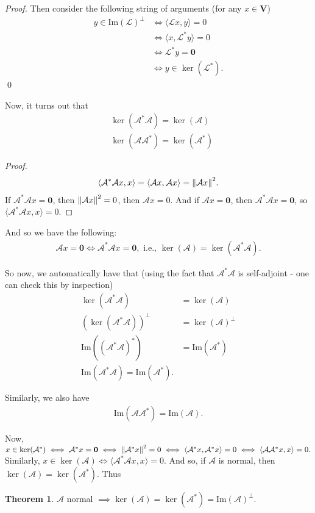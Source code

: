 \documentclass{article}
\theoremstyle{definition}
\newtheorem{thm}{Theorem}[section]
\newcommand{\V}{\mathbf{V}}
\newcommand{\A}{\mathcal{A}}
\newcommand{\lag}{\mathcal{L}}
\newcommand{\ima}{\text{Im}}
\newcommand{\la}{\langle}
\newcommand{\ra}{\rangle}
\begin{document}
\begin{proof}
	Then consider the following string of arguments (for any $x\in \V$)
	\begin{align*}
	y \in \ima(\lag)^\perp &\iff \la \lag x,y \ra = 0\\
	&\iff \la x, \lag^*y \ra = 0\\
	&\iff \lag^* y = \mathbf{0}\\
	&\iff y\in \ker(\lag^*).
	\end{align*}\qed
\end{proof}



Now, it turns out that 
\begin{align*}
&\ker(\A^*\A) = \ker(\A)\\
&\ker(\A\A^*) = \ker(\A^*)
\end{align*}

\begin{proof}
	\begin{align*}
	\la \A^*\A x,x \ra = \la \A x,\A x \ra = \norm{\A x}^2.
	\end{align*}
	If $\A^*\A x = \mathbf{0}$, then $\norm{\A x}^2 = 0$, then $\A x = 0$. And if $\A x = \mathbf{0}$, then $\A^*\A x = \mathbf{0}$, so $\la \A^*\A x,x\ra = 0$. 
\end{proof}

And so we have the following:
\begin{align*}
\A x = \mathbf{0} \iff \A^*\A x = \mathbf{0}, \text{ i.e., } \ker(\A) = \ker(\A^*\A).
\end{align*}

So now, we automatically have that (using the fact that $\A^*\A$ is self-adjoint - one can check this by inspection)
\begin{align*}
\ker(\A^*\A) &= \ker(\A)\\
(\ker(\A^*\A))^\perp &= \ker(\A)^\perp\\
\ima({(\A^*\A)}^*) &= \ima(\A^*)\\
\ima(\A^*\A) = \ima(\A^*).
\end{align*}

Similarly, we also have 
\begin{align*}
\ima(\A\A^*) = \ima(\A).
\end{align*}


Now, $x\in \ker(\A^*) \iff \A^* x = \mathbf{0} \iff \norm{\A^* x}^2 = 0\iff
\la \A^* x, \A^* x \ra = 0\iff \la \A\A^* x, x \ra = 0.$
Similarly, $x\in \ker(\A) \iff \la \A^*\A x,x \ra = 0$. And so, if $\A$ is normal, then $\ker(\A) = \ker(\A^*)$. Thus
\begin{thm}
	$\A$ normal $\implies \ker(\A) = \ker(\A^*) = \ima(\A)^\perp$.
\end{thm}
\end{document}

